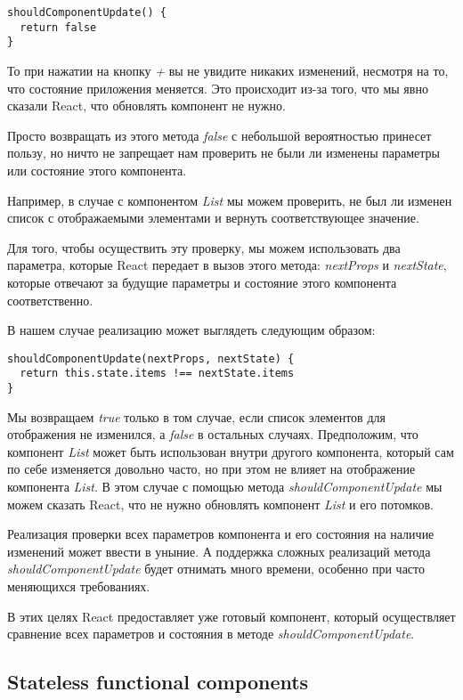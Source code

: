 \begin{lstlisting}
shouldComponentUpdate() {
  return false
}
\end{lstlisting}

То при нажатии на кнопку \textit{+} вы не увидите никаких изменений, несмотря на то, что состояние приложения меняется. Это происходит из-за того, что мы явно сказали React, что обновлять компонент не нужно.

Просто возвращать из этого метода \textit{false} с небольшой вероятностью принесет пользу, но ничто не запрещает нам проверить не были ли изменены параметры или состояние этого компонента.

Например, в случае с компонентом \textit{List} мы можем проверить, не был ли изменен список с отображаемыми элементами и вернуть соответствующее значение.

Для того, чтобы осуществить эту проверку, мы можем использовать два параметра, которые React передает в вызов этого метода: \textit{nextProps} и \textit{nextState}, которые отвечают за будущие параметры и состояние этого компонента соответственно.

В нашем случае реализацию может выглядеть следующим образом:

\begin{lstlisting}
shouldComponentUpdate(nextProps, nextState) {
  return this.state.items !== nextState.items
}
\end{lstlisting}

Мы возвращаем \textit{true} только в том случае, если список элементов для отображения не изменился, а \textit{false} в остальных случаях. Предположим, что компонент \textit{List} может быть использован внутри другого компонента, который сам по себе изменяется довольно часто, но при этом не влияет на отображение компонента \textit{List}. В этом случае с помощью метода \textit{shouldComponentUpdate} мы можем сказать React, что не нужно обновлять компонент \textit{List} и его потомков.

Реализация проверки всех параметров компонента и его состояния на наличие изменений может ввести в уныние. А поддержка сложных реализаций метода \textit{shouldComponentUpdate} будет отнимать много времени, особенно при часто меняющихся требованиях.

В этих целях React предоставляет уже готовый компонент, который осуществляет сравнение всех параметров и состояния в методе \textit{shouldComponentUpdate}.



\subsection{Stateless functional components}

